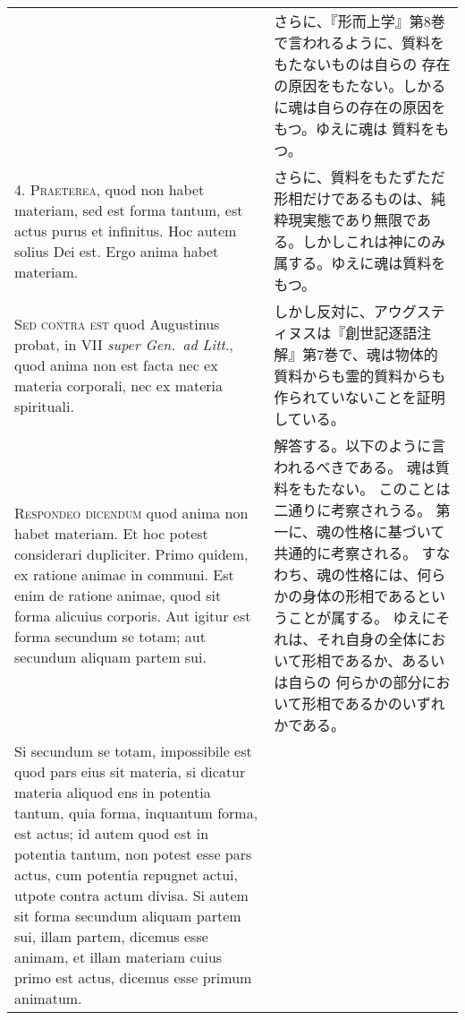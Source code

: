 \documentclass[paper=a4paper,fontsize=10pt,jafontsize=9pt,titlepage]{jlreq}
\begin{document}
\begin{longtable}{p{21em}p{21em}}
&

さらに、『形而上学』第8巻で言われるように、質料をもたないものは自らの
 存在の原因をもたない。しかるに魂は自らの存在の原因をもつ。ゆえに魂は
 質料をもつ。


\\



4. {\scshape Praeterea}, quod non habet materiam, sed est forma
tantum, est actus purus et infinitus. Hoc autem solius Dei est. Ergo
anima habet materiam.


&

さらに、質料をもたずただ形相だけであるものは、純粋現実態であり無限であ
 る。しかしこれは神にのみ属する。ゆえに魂は質料をもつ。

\\



{\scshape Sed contra est} quod Augustinus probat, in VII {\itshape
super Gen.~ad Litt}., quod anima non est facta nec ex materia
corporali, nec ex materia spirituali.


&

しかし反対に、アウグスティヌスは『創世記逐語注解』第7巻で、魂は物体的
 質料からも霊的質料からも作られていないことを証明している。

\\



{\scshape Respondeo dicendum} quod anima non habet materiam. Et hoc
potest considerari dupliciter. Primo quidem, ex ratione animae in
communi. Est enim de ratione animae, quod sit forma alicuius
corporis. Aut igitur est forma secundum se totam; aut secundum aliquam
partem sui. 


&

解答する。以下のように言われるべきである。
魂は質料をもたない。
このことは二通りに考察されうる。
第一に、魂の性格に基づいて共通的に考察される。
すなわち、魂の性格には、何らかの身体の形相であるということが属する。
ゆえにそれは、それ自身の全体において形相であるか、あるいは自らの
何らかの部分において形相であるかのいずれかである。


\\

Si secundum se totam, impossibile est quod pars eius sit
materia, si dicatur materia aliquod ens in potentia tantum, quia
forma, inquantum forma, est actus; id autem quod est in potentia
tantum, non potest esse pars actus, cum potentia repugnet actui,
utpote contra actum divisa. Si autem sit forma secundum aliquam partem
sui, illam partem, dicemus esse animam, et illam materiam cuius primo
est actus, dicemus esse primum animatum. 




\end{longtable}
\end{document}
